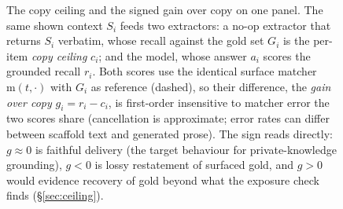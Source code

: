 \begin{figure}[t]
{}
\caption{The copy ceiling and the signed gain over copy on one panel. The same shown context $S_i$ feeds
two extractors: a no-op extractor that returns $S_i$ verbatim, whose recall against the gold set $G_i$
is the per-item \emph{copy ceiling} $c_i$; and the model, whose answer $a_i$ scores the grounded recall
$r_i$. Both scores use the identical surface matcher $\mathrm{m}(t,\cdot)$ with $G_i$ as reference
(dashed), so their difference, the \emph{gain over copy} $g_i=r_i-c_i$, is first-order insensitive to
matcher error the two scores share (cancellation is approximate; error rates can differ between
scaffold text and generated prose). The sign reads directly: $g\approx0$ is faithful delivery (the target
behaviour for private-knowledge grounding), $g<0$ is lossy restatement of surfaced gold, and $g>0$
would evidence recovery of gold beyond what the exposure check finds (\S\ref{sec:ceiling}).}
\label{fig:ceiling}
\end{figure}
